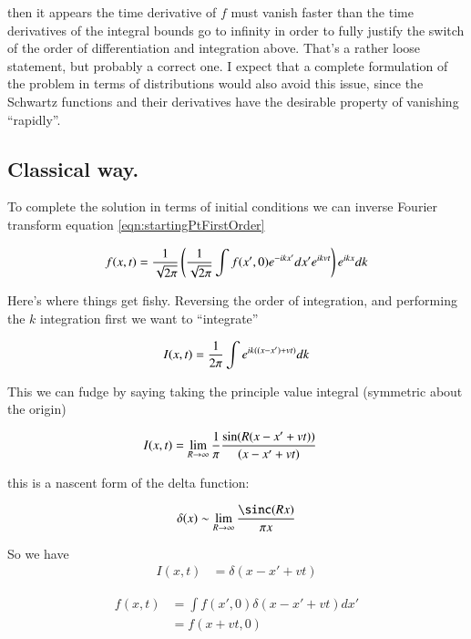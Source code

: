 then
it appears the time derivative of $f$ must vanish faster than the time derivatives of the 
integral bounds go to infinity in order to fully justify the switch of 
the order of differentiation and integration above.  That's a rather loose statement, but probably a correct one.  I expect that
a complete formulation of the problem in terms of distributions would also avoid this issue, since the Schwartz functions and their 
derivatives have the desirable property of vanishing ``rapidly''.

\subsection{Classical way. }

To complete the solution in terms of initial conditions we can inverse Fourier transform
equation \ref{eqn:startingPtFirstOrder}

\begin{align*}
{{f}}(x,t) = \frac{1}{\sqrt{2\pi}} \left( \frac{1}{\sqrt{2\pi}}\int f(x',0) e^{-i k x'} dx' e^{i k v t} \right) e^{ i k x } dk
\end{align*}

Here's where things get fishy.  Reversing the order of integration, and performing
the $k$ integration first we want to ``integrate''

\begin{align*}
I(x,t) = \frac{1}{2\pi} \int e^{ i k ((x-x') + v t) } dk
\end{align*}

This we can fudge by saying taking the principle value integral (symmetric about the origin)

\begin{align*}
I(x,t) &= \lim_{R \rightarrow \infty} \frac{1}{\pi} \frac{\sin( R (x-x' + v t) )}{ (x-x' + vt)}
\end{align*}

this is a nascent form of the delta function:

\begin{align*}
\delta(x) \sim \lim_{R \rightarrow \infty} \frac{\sinc( R x )}{\pi x}
\end{align*}

So we have
\begin{align*}
I(x,t) &= \delta(x - x' + v t) 
\end{align*}

\begin{align*}
{{f}}(x,t) 
&= \int f(x',0) \delta(x - x' + v t) dx' \\
&= f(x + v t,0) 
\end{align*}

